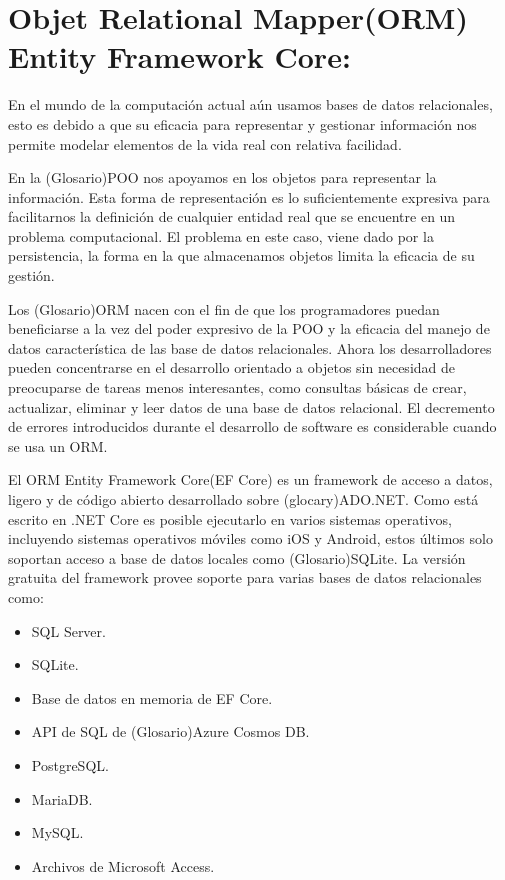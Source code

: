 \section{Objet Relational Mapper(ORM) Entity Framework Core:}

En el mundo de la computación actual aún usamos bases de datos relacionales, esto es debido a que su eficacia para representar y gestionar información nos permite modelar elementos de la vida real con relativa facilidad.

En la (Glosario)POO nos apoyamos en los objetos para representar la información. Esta forma de representación es lo suficientemente expresiva para facilitarnos la definición de cualquier entidad real que se encuentre en un problema computacional. El problema en este caso, viene dado por la persistencia, la forma en la que almacenamos objetos limita la eficacia de su gestión.
\newline

Los (Glosario)ORM nacen con el fin de que los programadores puedan beneficiarse a la vez del poder expresivo de la POO y la eficacia del manejo de datos característica de las base de datos relacionales. Ahora los desarrolladores pueden concentrarse en el desarrollo orientado a objetos sin necesidad de preocuparse de tareas menos interesantes, como consultas básicas de crear, actualizar, eliminar y leer datos de una base de datos relacional. El decremento de errores  introducidos durante el desarrollo de software es considerable cuando se usa un ORM.
\newline

El ORM Entity Framework Core(EF Core) es un framework de acceso a datos, ligero y de código abierto desarrollado sobre (glocary)ADO.NET. Como está escrito en .NET Core es posible ejecutarlo en varios sistemas operativos, incluyendo sistemas operativos móviles como iOS y Android, estos últimos solo soportan acceso a base de datos locales como (Glosario)SQLite. La versión gratuita del framework provee soporte para varias bases de datos relacionales como:


\begin{itemize}
	\item SQL Server.
    \item SQLite.
    \item Base de datos en memoria de EF Core.
    \item API de SQL de (Glosario)Azure Cosmos DB.
    \item PostgreSQL.
    \item MariaDB.
    \item MySQL.
    \item Archivos de Microsoft Access.
    
\end{itemize}

